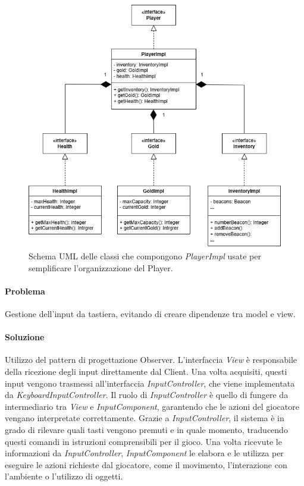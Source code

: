 \documentclass{report}
\begin{document}
\begin{figure}[H]
    \centering
    \includegraphics[width=13cm]{PlayerImpl.png}
    \caption{Schema UML delle classi che compongono \textit{PlayerImpl} usate per semplificare l'organizzazione del Player.}
    \label{img:PlayerImpl.png}
\end{figure}

\paragraph{Problema} Gestione dell’input da tastiera, evitando di creare dipendenze tra model e view.

\paragraph{Soluzione} Utilizzo del pattern di progettazione Observer. \newline
%
L’interfaccia \textit{View} è responsabile della ricezione degli input direttamente dal Client. Una volta acquisiti, questi input vengono trasmessi all’interfaccia \textit{InputController}, 
%
che viene implementata da \textit{KeyboardInputController}. 
%
Il ruolo di \textit{InputController} è quello di fungere da intermediario tra \textit{View} e \textit{InputComponent}, garantendo che le azioni del giocatore vengano interpretate correttamente. \newline 
%
Grazie a \textit{InputController}, il sistema è in grado di rilevare quali tasti vengono premuti e in quale momento, traducendo questi comandi in istruzioni comprensibili per il gioco.
%
Una volta ricevute le informazioni da \textit{InputController}, \textit{InputComponent} le elabora e le utilizza per eseguire le azioni richieste dal giocatore, come il movimento, l’interazione 
%
con l’ambiente o l’utilizzo di oggetti.
\end{document}
